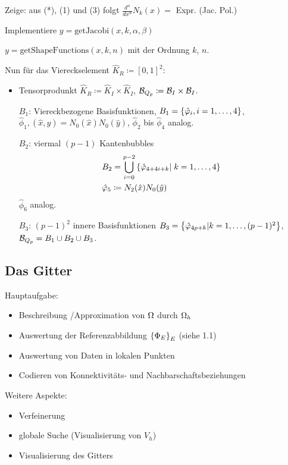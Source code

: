 \begin{uebung}
  Zeige: aus (*), (1) und (3) folgt $\frac {d^n}{dx^n} N_k(x)= $ Expr. (Jac. Pol.) 
\end{uebung}
\begin{uebung}
  Implementiere
$y = \text{getJacobi}(x, k, \alpha, \beta)$

$y = \text{getShapeFunctions}(x, k, n)$ mit der Ordnung $k$, $n$.
\end{uebung}
Nun für das Viereckselement $\hat K_R \coloneqq [0, 1]^2$: 

\begin{itemize}
\item Tensorprodunkt $\hat K_R \coloneqq \hat K_I \times \hat K_I$, ${\cal B}_{Q_p} \coloneqq {\cal B}_I \times {\cal B}_I$. %

$B_1$: Viereckbezogene Basisfunktionen, $B_1 = \left\{ \hat {\varphi}_i, i = 1, \dots, 4 \right\}$, $\hat \phi_1, (\hat x, \hat y) = N_0(\hat x) N_0 (\hat y)$, $\hat \phi_2$ bis $\hat \phi_4$ analog. 

$B_2$: viermal $(p-1)$ Kantenbubbles
\begin{align*}
  &B_2 = \bigcup_{i = 0}^{p-2} \left\{ \hat {\varphi}_{4 + 4i+ k} | \; k = 1, \dots, 4 \right\}\\
  &\hat {\varphi}_5 \coloneqq N_2(\hat x) N_0(\hat y)
\end{align*}
$\hat \phi_6$ analog. 

$B_3$: $(p-1)^2$ innere Basisfunktionen $B_3 = \left\{ \hat {\varphi}_{4p + k} | k = 1, \dots, (p-1)^2 \right\}$, ${\cal B}_{Q_p} = B_1 \cup B_2 \cup B_3$.
\end{itemize}

\subsection{Das Gitter}

Hauptaufgabe:
\begin{itemize}
\item Beschreibung /Approximation von $\Omega$ durch $\Omega_h$
\item Auswertung der Referenzabbildung $\left\{ \Phi_E \right\}_E$ (siehe 1.1)
\item Auswertung von Daten in lokalen Punkten
\item Codieren von Konnektivitäts- und Nachbarschaftsbeziehungen 
\end{itemize}
Weitere Aspekte: 
\begin{itemize}
\item Verfeinerung
\item globale Suche (Visualisierung von $V_h$)
\item Visualisierung des Gitters
\end{itemize}
